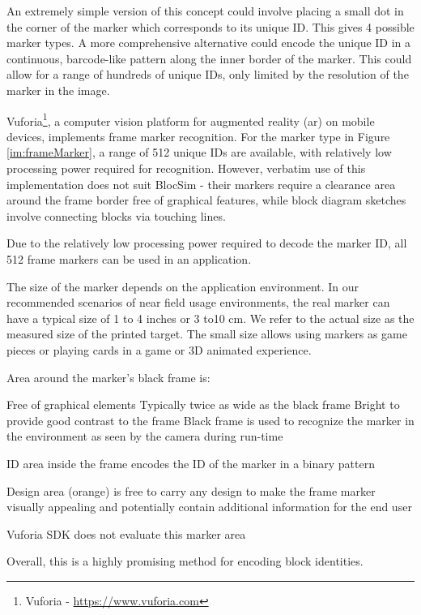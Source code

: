 An extremely simple version of this concept could involve placing a small dot in the corner of the marker which corresponds to its unique ID. This gives 4 possible marker types. A more comprehensive alternative could encode the unique ID in a continuous, barcode-like pattern along the inner border of the marker. This could allow for a range of hundreds of unique IDs, only limited by the resolution of the marker in the image.

Vuforia\footnote{Vuforia - \url{https://www.vuforia.com}}, a computer vision platform for augmented reality (\gls{ar}) on mobile devices, implements frame marker recognition. For the marker type in Figure \ref{im:frameMarker}, a range of 512 unique IDs are available, with relatively low processing power required for recognition. However, verbatim use of this implementation does not suit BlocSim - their markers require a clearance area around the frame border free of graphical features, while block diagram sketches involve connecting blocks via touching lines.

\cite{vuforia}


Due to the relatively low processing power required to decode the marker ID, all 512 frame markers can be used in an application.

The size of the marker depends on the application environment. In our recommended scenarios of near field usage environments, the real marker can have a typical size of 1 to 4 inches or 3 to10 cm. We refer to the actual size as the measured size of the printed target. The small size allows using markers as game pieces or playing cards in a game or 3D animated experience.


Area around the marker’s black frame is:

Free of graphical elements
Typically twice as wide as the black frame
Bright to provide good contrast to the frame
Black frame is used to recognize the marker in the environment as seen by the camera during run-time

ID area inside the frame encodes the ID of the marker in a binary pattern

Design area (orange) is free to carry any design to make the frame marker visually appealing and potentially contain additional information for the end user

Vuforia SDK does not evaluate this marker area



Overall, this is a highly promising method for encoding block identities.

